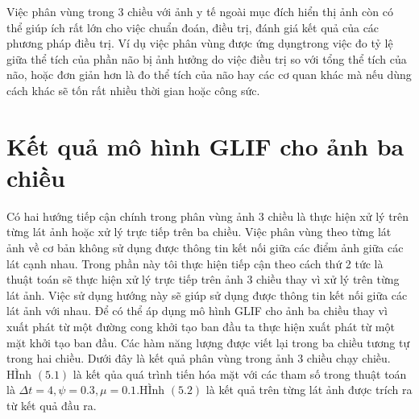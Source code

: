 \documentclass[14pt,oneside,a4paper]{extreport}
\begin{document}
Việc  phân vùng trong 3 chiều với ảnh y tế ngoài mục đích hiển thị ảnh còn có thể giúp ích rất lớn cho việc chuẩn đoán, điều trị, đánh giá kết quả của các phương pháp điều trị. Ví dụ việc phân vùng được ứng dụngtrong việc đo tỷ lệ giữa thể tích của phần não bị ảnh hưởng do việc điều trị so với tổng thể tích của não, hoặc đơn giản hơn là đo thể tích của não hay các cơ quan khác mà nếu dùng cách khác sẽ tốn rất nhiều thời gian hoặc công sức.
\section{Kết quả mô hình GLIF cho ảnh ba chiều}
Có hai hướng tiếp cận chính trong phân vùng ảnh 3 chiều là thực hiện xử lý trên từng lát ảnh hoặc xử lý trực tiếp trên ba chiều. Việc phân vùng theo từng lát ảnh về cơ bản không sử dụng được thông tin kết nối giữa các điểm ảnh giữa các lát cạnh nhau. Trong phần này tôi thực hiện tiếp cận theo cách thứ 2 tức là thuật toán sẽ thực hiện xử lý trực tiếp trên ảnh 3 chiều thay vì xử lý trên từng lát ảnh. Việc sử dụng hướng này sẽ giúp sử dụng được thông tin kết nối giữa các lát ảnh với nhau.
Để có thể áp dụng mô hình GLIF cho ảnh ba chiều thay vì xuất phát từ một đường cong khởi tạo ban đầu ta thực hiện xuất phát từ một mặt khởi tạo ban đầu. Các hàm năng lượng được viết lại trong ba chiều tương tự trong hai chiều. Dưới đây là kết quả phân vùng trong ảnh 3 chiều chạy chiều. HÌnh $(5.1)$ là kết qủa quá trình tiến hóa mặt  với các tham số trong thuật toán là $\Delta t=4,\psi=0.3,\mu=0.1 $.HÌnh $(5.2)$ là kết quả trên từng lát ảnh được trích ra từ kết quả đầu ra.
\end{document}
